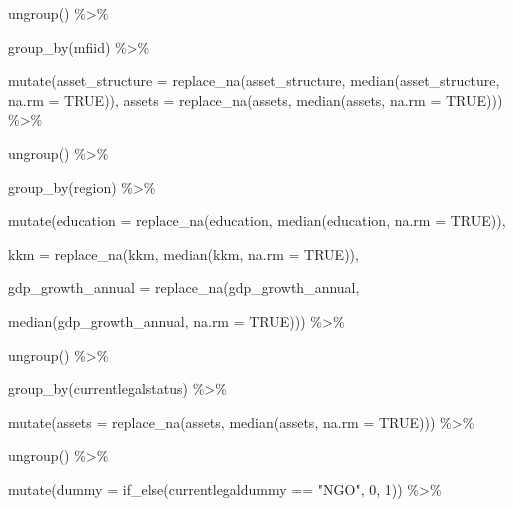 \documentclass[a4paper,nobind]{templates/ociamthesis}
\newenvironment{Shaded}{\begin{snugshade}}{\end{snugshade}}
\newcommand{\AttributeTok}[1]{\textcolor[rgb]{0.77,0.63,0.00}{#1}}
\newcommand{\ConstantTok}[1]{\textcolor[rgb]{0.00,0.00,0.00}{#1}}
\newcommand{\DecValTok}[1]{\textcolor[rgb]{0.00,0.00,0.81}{#1}}
\newcommand{\FunctionTok}[1]{\textcolor[rgb]{0.00,0.00,0.00}{#1}}
\newcommand{\NormalTok}[1]{#1}
\newcommand{\SpecialCharTok}[1]{\textcolor[rgb]{0.00,0.00,0.00}{#1}}
\newcommand{\StringTok}[1]{\textcolor[rgb]{0.31,0.60,0.02}{#1}}
\renewenvironment{Shaded}
{
  \vspace{10pt}%
  \begin{snugshade}%
}{%
  \end{snugshade}%
  \vspace{8pt}%
}
\begin{document}
\begin{Shaded}
\begin{Highlighting}[]
  \FunctionTok{ungroup}\NormalTok{() }\SpecialCharTok{\%\textgreater{}\%} 
  
  \FunctionTok{group\_by}\NormalTok{(mfiid) }\SpecialCharTok{\%\textgreater{}\%} 
  
  \FunctionTok{mutate}\NormalTok{(}\AttributeTok{asset\_structure =} \FunctionTok{replace\_na}\NormalTok{(asset\_structure, }\FunctionTok{median}\NormalTok{(asset\_structure, }\AttributeTok{na.rm =} \ConstantTok{TRUE}\NormalTok{)), }\AttributeTok{assets =} \FunctionTok{replace\_na}\NormalTok{(assets, }\FunctionTok{median}\NormalTok{(assets, }\AttributeTok{na.rm =} \ConstantTok{TRUE}\NormalTok{))) }\SpecialCharTok{\%\textgreater{}\%} 
  
  \FunctionTok{ungroup}\NormalTok{() }\SpecialCharTok{\%\textgreater{}\%} 
  
  \FunctionTok{group\_by}\NormalTok{(region) }\SpecialCharTok{\%\textgreater{}\%} 
  
  \FunctionTok{mutate}\NormalTok{(}\AttributeTok{education =} \FunctionTok{replace\_na}\NormalTok{(education, }\FunctionTok{median}\NormalTok{(education, }\AttributeTok{na.rm =} \ConstantTok{TRUE}\NormalTok{)),}
         
         \AttributeTok{kkm =} \FunctionTok{replace\_na}\NormalTok{(kkm, }\FunctionTok{median}\NormalTok{(kkm, }\AttributeTok{na.rm =} \ConstantTok{TRUE}\NormalTok{)),}
         
         \AttributeTok{gdp\_growth\_annual =} \FunctionTok{replace\_na}\NormalTok{(gdp\_growth\_annual, }
                                        
         \FunctionTok{median}\NormalTok{(gdp\_growth\_annual, }\AttributeTok{na.rm =} \ConstantTok{TRUE}\NormalTok{))) }\SpecialCharTok{\%\textgreater{}\%} 
  
  \FunctionTok{ungroup}\NormalTok{() }\SpecialCharTok{\%\textgreater{}\%} 
  
  \FunctionTok{group\_by}\NormalTok{(currentlegalstatus) }\SpecialCharTok{\%\textgreater{}\%} 
  
  \FunctionTok{mutate}\NormalTok{(}\AttributeTok{assets =} \FunctionTok{replace\_na}\NormalTok{(assets, }\FunctionTok{median}\NormalTok{(assets, }\AttributeTok{na.rm =} \ConstantTok{TRUE}\NormalTok{))) }\SpecialCharTok{\%\textgreater{}\%} 
  
  \FunctionTok{ungroup}\NormalTok{() }\SpecialCharTok{\%\textgreater{}\%} 
  
  \FunctionTok{mutate}\NormalTok{(}\AttributeTok{dummy =} \FunctionTok{if\_else}\NormalTok{(currentlegaldummy }\SpecialCharTok{==} \StringTok{"NGO"}\NormalTok{, }\DecValTok{0}\NormalTok{, }\DecValTok{1}\NormalTok{)) }\SpecialCharTok{\%\textgreater{}\%} 
  

\end{Highlighting}
\end{Shaded}
\end{document}
